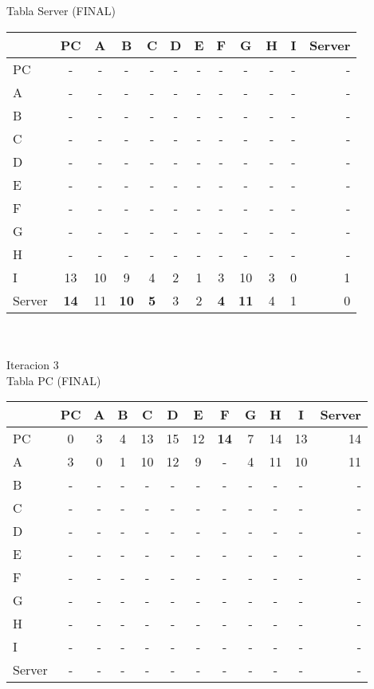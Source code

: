 \documentclass{article}
\begin{document}
\\
\\
Tabla Server (FINAL)\\
\begin{tabular}{l*{10}{c}r}
              & PC & A & B & C & D & E & F & G & H & I & Server \\
\hline
PC             & - & - & - & - & - & - & - & - & - & - & -\\
A              & - & - & - & - & - & - & - & - & - & - & -\\
B              & - & - & - & - & - & - & - & - & - & - & -\\
C              & - & - & - & - & - & - & - & - & - & - & -\\
D              & - & - & - & - & - & - & - & - & - & - & -\\
E              & - & - & - & - & - & - & - & - & - & - & -\\
F              & - & - & - & - & - & - & - & - & - & - & -\\
G              & - & - & - & - & - & - & - & - & - & - & -\\
H              & - & - & - & - & - & - & - & - & - & - & -\\
I              & 13 & 10 & 9 & 4 & 2 & 1 & 3 & 10 & 3 & 0 & 1\\
Server         &\bf{14}& 11 &\bf{10}&\bf{5}& 3 & 2 &\bf{4}&\bf{11}& 4 & 1 & 0\\

\end{tabular}
\\
\\
Iteracion 3
\\
Tabla PC (FINAL)\\
\begin{tabular}{l*{10}{c}r}
              & PC & A & B & C & D & E & F  & G & H & I & Server \\
\hline
PC             & 0 & 3 & 4 & 13& 15& 12&\bf{14}& 7 & 14 & 13 & 14\\
A              & 3 & 0 & 1 & 10 & 12 & 9 & - & 4 & 11 & 10 & 11 \\
B              & - & - & - & - & - & - & - & - & - & - & - \\
C              & - & - & - & - & - & - & - & - & - & - & - \\
D              & - & - & - & - & - & - & - & - & - & - & - \\
E              & - & - & - & - & - & - & - & - & - & - & - \\
F              & - & - & - & - & - & - & - & - & - & - & - \\
G              & - & - & - & - & - & - & - & - & - & - & - \\
H              & - & - & - & - & - & - & - & - & - & - & - \\
I              & - & - & - & - & - & - & - & - & - & - & - \\
Server         & - & - & - & - & - & - & - & - & - & - & - \\	

\end{tabular}
\end{document}
